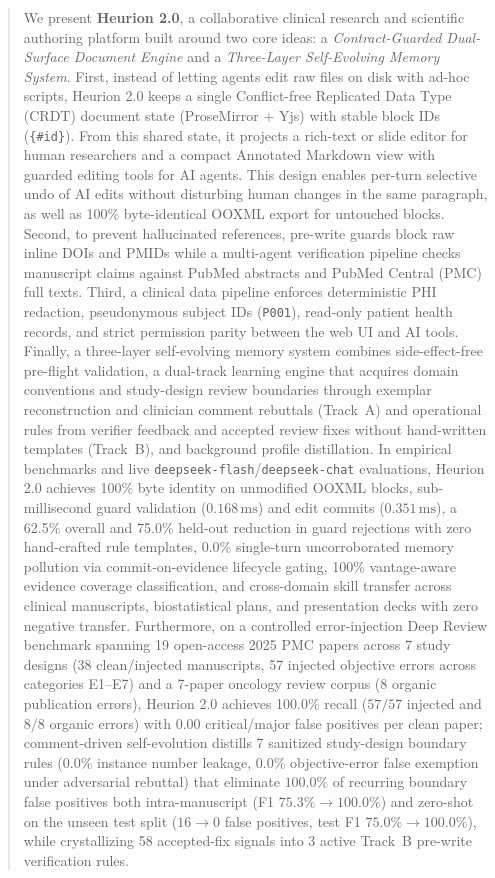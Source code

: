 \documentclass[11pt,a4paper]{article}
\begin{document}
\begin{abstract}
We present \textbf{Heurion 2.0}, a collaborative clinical research and scientific authoring platform built around two core ideas: a \emph{Contract-Guarded Dual-Surface Document Engine} and a \emph{Three-Layer Self-Evolving Memory System}. First, instead of letting agents edit raw files on disk with ad-hoc scripts, Heurion 2.0 keeps a single Conflict-free Replicated Data Type (CRDT) document state (ProseMirror + Yjs) with stable block IDs (\texttt{\{\#id\}}). From this shared state, it projects a rich-text or slide editor for human researchers and a compact Annotated Markdown view with guarded editing tools for AI agents. This design enables per-turn selective undo of AI edits without disturbing human changes in the same paragraph, as well as 100\% byte-identical OOXML export for untouched blocks. Second, to prevent hallucinated references, pre-write guards block raw inline DOIs and PMIDs while a multi-agent verification pipeline checks manuscript claims against PubMed abstracts and PubMed Central (PMC) full texts. Third, a clinical data pipeline enforces deterministic PHI redaction, pseudonymous subject IDs (\texttt{P001}), read-only patient health records, and strict permission parity between the web UI and AI tools. Finally, a three-layer self-evolving memory system combines side-effect-free pre-flight validation, a dual-track learning engine that acquires domain conventions and study-design review boundaries through exemplar reconstruction and clinician comment rebuttals (Track~A) and operational rules from verifier feedback and accepted review fixes without hand-written templates (Track~B), and background profile distillation. In empirical benchmarks and live \texttt{deepseek-flash}/\texttt{deepseek-chat} evaluations, Heurion 2.0 achieves 100\% byte identity on unmodified OOXML blocks, sub-millisecond guard validation ($0.168\,\text{ms}$) and edit commits ($0.351\,\text{ms}$), a 62.5\% overall and 75.0\% held-out reduction in guard rejections with zero hand-crafted rule templates, 0.0\% single-turn uncorroborated memory pollution via commit-on-evidence lifecycle gating, 100\% vantage-aware evidence coverage classification, and cross-domain skill transfer across clinical manuscripts, biostatistical plans, and presentation decks with zero negative transfer. Furthermore, on a controlled error-injection Deep Review benchmark spanning 19 open-access 2025 PMC papers across 7 study designs (38 clean/injected manuscripts, 57 injected objective errors across categories E1--E7) and a 7-paper oncology review corpus (8 organic publication errors), Heurion 2.0 achieves 100.0\% recall ($57/57$ injected and $8/8$ organic errors) with 0.00 critical/major false positives per clean paper; comment-driven self-evolution distills 7 sanitized study-design boundary rules ($0.0\%$ instance number leakage, $0.0\%$ objective-error false exemption under adversarial rebuttal) that eliminate $100.0\%$ of recurring boundary false positives both intra-manuscript (F1 $75.3\% \to 100.0\%$) and zero-shot on the unseen test split ($16 \to 0$ false positives, test F1 $75.0\% \to 100.0\%$), while crystallizing 58 accepted-fix signals into 3 active Track~B pre-write verification rules.
\end{abstract}
\end{document}
